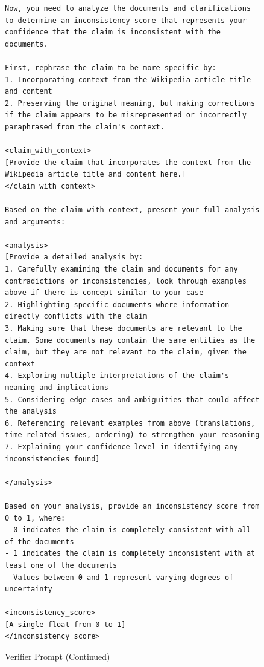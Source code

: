\documentclass[11pt]{article}
\begin{document}
\begin{figure}[htb]
\begin{lstlisting}
Now, you need to analyze the documents and clarifications to determine an inconsistency score that represents your confidence that the claim is inconsistent with the documents.

First, rephrase the claim to be more specific by:
1. Incorporating context from the Wikipedia article title and content
2. Preserving the original meaning, but making corrections if the claim appears to be misrepresented or incorrectly paraphrased from the claim's context.

<claim_with_context>
[Provide the claim that incorporates the context from the Wikipedia article title and content here.]
</claim_with_context>

Based on the claim with context, present your full analysis and arguments:

<analysis>
[Provide a detailed analysis by:
1. Carefully examining the claim and documents for any contradictions or inconsistencies, look through examples above if there is concept similar to your case
2. Highlighting specific documents where information directly conflicts with the claim
3. Making sure that these documents are relevant to the claim. Some documents may contain the same entities as the claim, but they are not relevant to the claim, given the context
4. Exploring multiple interpretations of the claim's meaning and implications
5. Considering edge cases and ambiguities that could affect the analysis
6. Referencing relevant examples from above (translations, time-related issues, ordering) to strengthen your reasoning
7. Explaining your confidence level in identifying any inconsistencies found]

</analysis>

Based on your analysis, provide an inconsistency score from 0 to 1, where:
- 0 indicates the claim is completely consistent with all of the documents
- 1 indicates the claim is completely inconsistent with at least one of the documents
- Values between 0 and 1 represent varying degrees of uncertainty

<inconsistency_score>
[A single float from 0 to 1]
</inconsistency_score>
\end{lstlisting}

\caption{Verifier Prompt (Continued)} \label{lst:verifier_3}
\end{figure}
\end{document}
